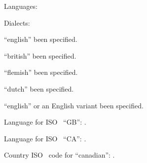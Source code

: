 \documentclass[a4paper]{article}
\begin{document}
Languages:

Dialects: 

``english''  been specified.

``british''  been specified.

``flemish''  been specified.

``dutch''  been specified.

``english'' or an English variant 
 been specified.

Language for ISO \TwoLetterIsoCountryCode\ ``GB'': 
.

Language for ISO \TwoLetterIsoCountryCode\ ``CA'': 
.

Country ISO \TwoLetterIsoCountryCode\ code for ``canadian'':
.
\end{document}
